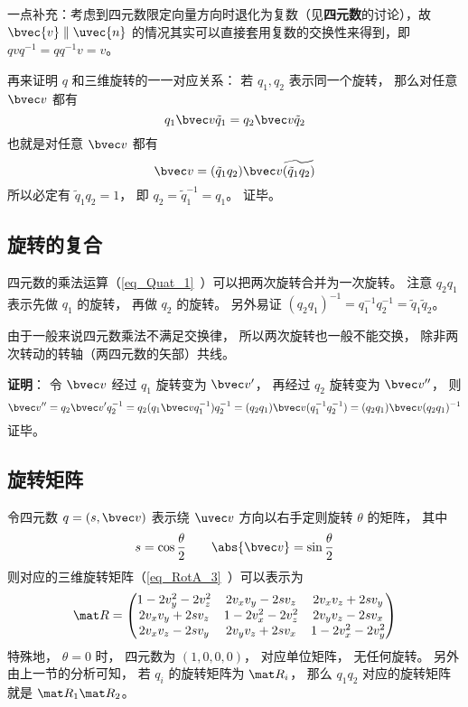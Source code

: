 一点补充：考虑到四元数限定向量方向时退化为复数（见\textbf{四元数}的讨论），故 $\bvec{v}\parallel{\uvec{n}}$ 的情况其实可以直接套用复数的交换性来得到，即 $qvq^{-1}=qq^{-1}v=v$。

再来证明 $q$ 和三维旋转的一一对应关系： 若 $q_1,q_2$ 表示同一个旋转， 那么对任意 $\bvec v$ 都有
\begin{equation}
q_1\bvec v \tilde q_1 = q_2\bvec v \tilde q_2
\end{equation}
也就是对任意 $\bvec v$ 都有
\begin{equation}
\bvec v = (\tilde q_1q_2)\bvec v \widetilde{(\tilde q_1q_2)}
\end{equation}
所以必定有 $\tilde q_1q_2 = 1$， 即 $q_2 = \tilde q_1^{-1} = q_1$。 证毕。

\subsection{旋转的复合}
四元数的乘法运算（\autoref{eq_Quat_1}~）可以把两次旋转合并为一次旋转。 注意 $q_2q_1$ 表示先做 $q_1$ 的旋转， 再做 $q_2$ 的旋转。 另外易证 $(q_2q_1)^{-1} = q_1^{-1} q_2^{-1} = \tilde q_1\tilde q_2$。

由于一般来说四元数乘法不满足交换律， 所以两次旋转也一般不能交换， 除非两次转动的转轴（两四元数的矢部）共线。

\textbf{证明}： 令 $\bvec v$ 经过 $q_1$ 旋转变为 $\bvec v'$， 再经过 $q_2$ 旋转变为 $\bvec v''$， 则
\begin{equation}
\bvec v'' = q_2\bvec v'q_2^{-1} = q_2(q_1\bvec vq_1^{-1}) q_2^{-1} = (q_2q_1)\bvec v(q_1^{-1} q_2^{-1}) = (q_2q_1)\bvec v(q_2q_1)^{-1}
\end{equation}
证毕。

\subsection{旋转矩阵}
令四元数 $q = (s, \bvec v)$ 表示绕 $\uvec v$ 方向以右手定则旋转 $\theta$ 的矩阵， 其中
\begin{equation}
s = \cos\frac{\theta}{2} \qquad
\abs{\bvec v} = \sin\frac{\theta}{2}
\end{equation}
则对应的三维旋转矩阵（\autoref{eq_RotA_3}~）可以表示为
\begin{equation}\label{eq_QuatN_2}
\mat R =
\begin{pmatrix}
1 - 2v_y^2 - 2v_z^2 & 2v_xv_y - 2sv_z  & 2v_x v_z + 2s v_y\\
2v_x v_y + 2sv_z & 1 - 2v_x^2 - 2v_z^2 & 2v_y v_z - 2s v_x\\
2v_x v_z - 2s v_y & 2v_y v_z + 2s v_x & 1 - 2v_x^2 - 2v_y^2
\end{pmatrix}
\end{equation}
特殊地， $\theta = 0$ 时， 四元数为 $(1,0,0,0)$， 对应单位矩阵， 无任何旋转。 另外由上一节的分析可知， 若 $q_i$ 的旋转矩阵为 $\mat R_i$， 那么 $q_1q_2$ 对应的旋转矩阵就是 $\mat R_1\mat R_2$。

